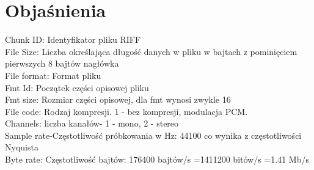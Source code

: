 \documentclass[12pt]{article}
\begin{document}
\section{Objaśnienia}
Chunk ID: 	Identyfikator pliku RIFF
\\File Size: Liczba określająca długość danych w pliku w bajtach z pominięciem pierwszych 8 bajtów nagłówka
\\File format: Format pliku
\\Fmt Id: 	Początek części opisowej pliku
\\Fmt size: Rozmiar części opisowej, dla fmt wynosi zwykle 16
\\File code: Rodzaj kompresji. 1 - bez kompresji, modulacja PCM.
\\Channels: liczba kanałów- 1 - mono, 2 - stereo
\\Sample rate-Częstotliwość próbkowania w Hz: 44100 co wynika z częstotliwości Nyquista
\\Byte rate: Częstotliwość bajtów: 176400 bajtów/s =1411200 bitów/s =1.41 Mb/s 
\end{document}
